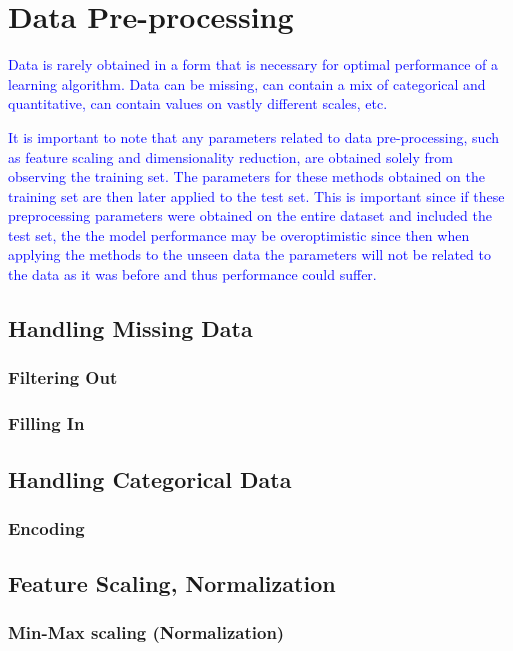\section{Data Pre-processing}

\textcolor{blue}{Data is rarely obtained in a form that is necessary for optimal performance of a learning algorithm. Data can be missing, can contain a mix of categorical and quantitative, can contain values on vastly different scales, etc.}

\textcolor{blue}{It is important to note that any parameters related to data pre-processing, such as feature scaling and dimensionality reduction, are obtained solely from observing the training set. The parameters for these methods obtained on the training set are then later applied to the test set. This is important since if these preprocessing parameters were obtained on the entire dataset and included the test set, the the model performance may be overoptimistic since then when applying the methods to the unseen data the parameters will not be related to the data as it was before and thus performance could suffer.}

\subsection{Handling Missing Data}

\subsubsection{Filtering Out}

\subsubsection{Filling In}

\subsection{Handling Categorical Data}

\subsubsection{Encoding}

\subsection{Feature Scaling, Normalization}

\subsubsection{Min-Max scaling (Normalization)}


